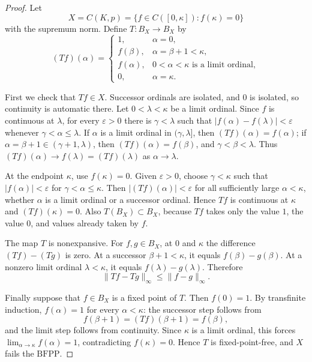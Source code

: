 \documentclass[11pt]{article}
\newcommand{\BFPP}{\mathrm{BFPP}}
\begin{document}
\begin{proof}
Let
\[
  X=C(K,p)=\{f\in C([0,\kappa]): f(\kappa)=0\}
\]
with the supremum norm.  Define \(T:B_X\to B_X\) by
\[
(Tf)(\alpha)=
\begin{cases}
1, & \alpha=0,\\
f(\beta), & \alpha=\beta+1<\kappa,\\
f(\alpha), & 0<\alpha<\kappa \text{ is a limit ordinal},\\
0, & \alpha=\kappa.
\end{cases}
\]

First we check that \(Tf\in X\).  Successor ordinals are isolated, and \(0\)
is isolated, so continuity is automatic there.  Let \(0<\lambda<\kappa\) be a
limit ordinal.  Since \(f\) is continuous at \(\lambda\), for every
\(\varepsilon>0\) there is \(\gamma<\lambda\) such that
\(|f(\alpha)-f(\lambda)|<\varepsilon\) whenever
\(\gamma<\alpha\le\lambda\).  If \(\alpha\) is a limit ordinal in
\((\gamma,\lambda]\), then \((Tf)(\alpha)=f(\alpha)\); if
\(\alpha=\beta+1\in(\gamma+1,\lambda)\), then
\((Tf)(\alpha)=f(\beta)\), and \(\gamma<\beta<\lambda\).  Thus
\((Tf)(\alpha)\to f(\lambda)=(Tf)(\lambda)\) as \(\alpha\to\lambda\).

At the endpoint \(\kappa\), use \(f(\kappa)=0\).  Given \(\varepsilon>0\),
choose \(\gamma<\kappa\) such that \(|f(\alpha)|<\varepsilon\) for
\(\gamma<\alpha\le\kappa\).  Then \(|(Tf)(\alpha)|<\varepsilon\) for all
sufficiently large \(\alpha<\kappa\), whether \(\alpha\) is a limit ordinal or
a successor ordinal.  Hence \(Tf\) is continuous at \(\kappa\) and
\((Tf)(\kappa)=0\).  Also \(T(B_X)\subset B_X\), because \(Tf\) takes only the
value \(1\), the value \(0\), and values already taken by \(f\).

The map \(T\) is nonexpansive.  For \(f,g\in B_X\), at \(0\) and \(\kappa\)
the difference \((Tf)-(Tg)\) is zero.  At a successor \(\beta+1<\kappa\), it
equals \(f(\beta)-g(\beta)\).  At a nonzero limit ordinal
\(\lambda<\kappa\), it equals \(f(\lambda)-g(\lambda)\).  Therefore
\[
  \|Tf-Tg\|_\infty\le \|f-g\|_\infty .
\]

Finally suppose that \(f\in B_X\) is a fixed point of \(T\).  Then
\(f(0)=1\).  By transfinite induction, \(f(\alpha)=1\) for every
\(\alpha<\kappa\): the successor step follows from
\[
  f(\beta+1)=(Tf)(\beta+1)=f(\beta),
\]
and the limit step follows from continuity.  Since \(\kappa\) is a limit
ordinal, this forces \(\lim_{\alpha\to\kappa}f(\alpha)=1\), contradicting
\(f(\kappa)=0\).  Hence \(T\) is fixed-point-free, and \(X\) fails the
\(\BFPP\).
\end{proof}
\end{document}
